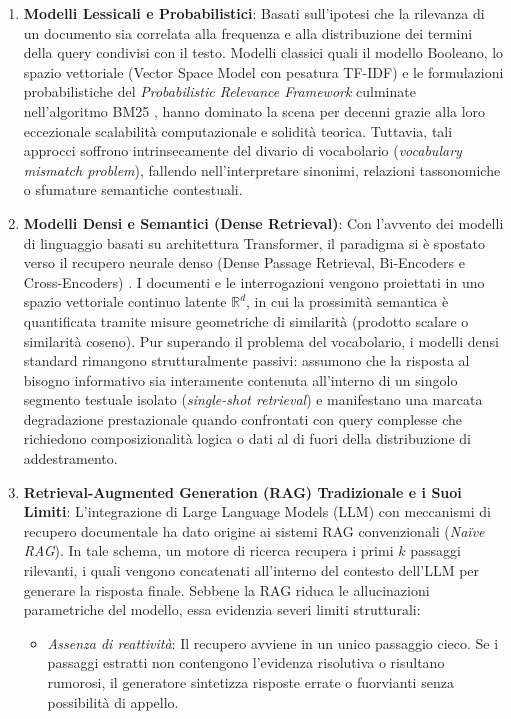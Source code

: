 \begin{enumerate}
    \item \textbf{Modelli Lessicali e Probabilistici}: Basati sull'ipotesi che la rilevanza di un documento sia correlata alla frequenza e alla distribuzione dei termini della query condivisi con il testo. Modelli classici quali il modello Booleano, lo spazio vettoriale (Vector Space Model con pesatura TF-IDF) e le formulazioni probabilistiche del \textit{Probabilistic Relevance Framework} culminate nell'algoritmo BM25 \cite{robertson2009probabilistic}, hanno dominato la scena per decenni grazie alla loro eccezionale scalabilità computazionale e solidità teorica. Tuttavia, tali approcci soffrono intrinsecamente del divario di vocabolario (\textit{vocabulary mismatch problem}), fallendo nell'interpretare sinonimi, relazioni tassonomiche o sfumature semantiche contestuali.
    \item \textbf{Modelli Densi e Semantici (Dense Retrieval)}: Con l'avvento dei modelli di linguaggio basati su architettura Transformer, il paradigma si è spostato verso il recupero neurale denso (Dense Passage Retrieval, Bi-Encoders e Cross-Encoders) \cite{karpukhin2020dense}. I documenti e le interrogazioni vengono proiettati in uno spazio vettoriale continuo latente $\mathbb{R}^d$, in cui la prossimità semantica è quantificata tramite misure geometriche di similarità (prodotto scalare o similarità coseno). Pur superando il problema del vocabolario, i modelli densi standard rimangono strutturalmente passivi: assumono che la risposta al bisogno informativo sia interamente contenuta all'interno di un singolo segmento testuale isolato (\textit{single-shot retrieval}) e manifestano una marcata degradazione prestazionale quando confrontati con query complesse che richiedono composizionalità logica o dati al di fuori della distribuzione di addestramento.
    \item \textbf{Retrieval-Augmented Generation (RAG) Tradizionale e i Suoi Limiti}: L'integrazione di Large Language Models (LLM) con meccanismi di recupero documentale ha dato origine ai sistemi RAG convenzionali (\textit{Naïve RAG}). In tale schema, un motore di ricerca recupera i primi $k$ passaggi rilevanti, i quali vengono concatenati all'interno del contesto dell'LLM per generare la risposta finale. Sebbene la RAG riduca le allucinazioni parametriche del modello, essa evidenzia severi limiti strutturali:
    \begin{itemize}
        \item \textit{Assenza di reattività}: Il recupero avviene in un unico passaggio cieco. Se i passaggi estratti non contengono l'evidenza risolutiva o risultano rumorosi, il generatore sintetizza risposte errate o fuorvianti senza possibilità di appello.

\end{itemize}
\end{enumerate}

